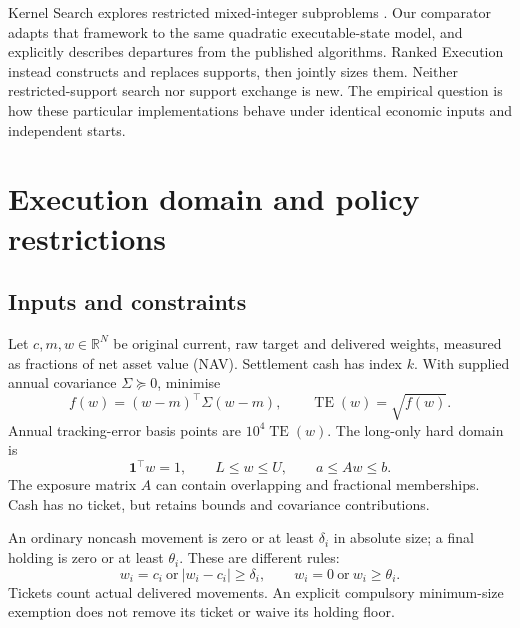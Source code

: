 \documentclass[preprint,12pt,authoryear]{elsarticle}
\newcommand{\TE}{\operatorname{TE}}
\newcommand{\R}{\mathbb{R}}
\begin{document}
Kernel Search explores restricted mixed-integer subproblems
\citep{kernel2012,kernel2014}. Our comparator adapts that framework to the same
quadratic executable-state model, and explicitly describes departures from the
published algorithms. Ranked Execution instead constructs and replaces supports,
then jointly sizes them. Neither restricted-support search nor support exchange
is new. The empirical question is how these particular implementations behave
under identical economic inputs and independent starts.

\section{Execution domain and policy restrictions}\label{sec:domain}
\subsection{Inputs and constraints}
Let $c,m,w\in\R^N$ be original current, raw target and delivered weights,
measured as fractions of net asset value (NAV). Settlement cash has index $k$.
With supplied annual covariance $\Sigma\succeq0$, minimise
\begin{equation}\label{eq:objective}
 f(w)=(w-m)^\top\Sigma(w-m),\qquad \TE(w)=\sqrt{f(w)}.
\end{equation}
Annual tracking-error basis points are $10^4\TE(w)$. The long-only hard domain is
\begin{equation}\label{eq:hard}
 \mathbf1^\top w=1,\qquad L\le w\le U,\qquad a\le Aw\le b.
\end{equation}
The exposure matrix $A$ can contain overlapping and fractional memberships.
Cash has no ticket, but retains bounds and covariance contributions.

An ordinary noncash movement is zero or at least $\delta_i$ in absolute size;
a final holding is zero or at least $\theta_i$. These are different rules:
\begin{equation}\label{eq:minima}
 w_i=c_i\ \text{or}\ |w_i-c_i|\ge\delta_i,\qquad
 w_i=0\ \text{or}\ w_i\ge\theta_i.
\end{equation}
Tickets count actual delivered movements. An explicit compulsory minimum-size
exemption does not remove its ticket or waive its holding floor.
\end{document}
